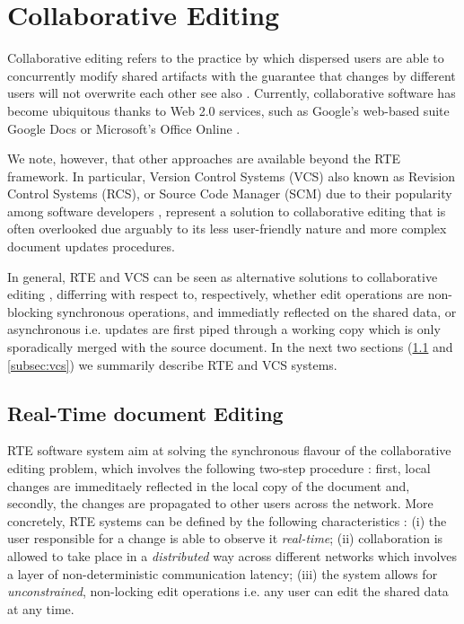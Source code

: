 \documentclass{sig-alternate}
\begin{document}
\section{Collaborative Editing}\label{sec:cde}
Collaborative editing refers to the practice by which dispersed
users are able to concurrently modify shared artifacts with the guarantee that changes
by different users will not overwrite each other \textemdash see also \cite{Altmanninger2009}.
Currently, collaborative software has become ubiquitous thanks to Web 2.0 services, such as
Google's web-based suite Google Docs \cite{Googlea} or
Microsoft's Office Online \cite{Microsoft}.

We note, however, that other approaches are available beyond the RTE framework. In
particular, Version Control Systems (VCS) \textemdash also known as Revision Control
Systems (RCS), or Source Code Manager (SCM) due to their popularity among software
developers \textemdash, represent a solution to collaborative editing that is often
overlooked due arguably to its less user-friendly nature and more complex document
updates procedures.

In general, RTE and VCS can be seen as alternative solutions to collaborative
editing \cite{Altmanninger2009}, differring with respect to, respectively, whether edit
operations are non-blocking synchronous operations, and immediatly reflected on the shared
data, or asynchronous \textemdash i.e. updates are first piped
through a working copy which is only sporadically merged with the source document.
In the next two sections (\ref{subsec:rte} and \ref{subsec:vcs}) we summarily describe RTE
and VCS systems.

\subsection{Real-Time document Editing}\label{subsec:rte}
RTE software system aim at solving the synchronous flavour of the collaborative editing
problem, which involves the following two-step procedure \cite{Imine2009}: first, local
changes are immeditaely reflected in the local copy of the document and, secondly,
the changes are propagated to other users across the network.
More concretely, RTE systems can be defined by the following characteristics \cite{Sun1998}:
(i) the user responsible for a change is able to observe it \textit{real-time};
(ii) collaboration is allowed to take place in a \textit{distributed} way across
different networks \textemdash which involves a layer of non-deterministic communication
latency; (iii) the system allows for \textit{unconstrained}, non-locking edit operations
\textemdash i.e. any user can edit the shared data at any time.
\end{document}
